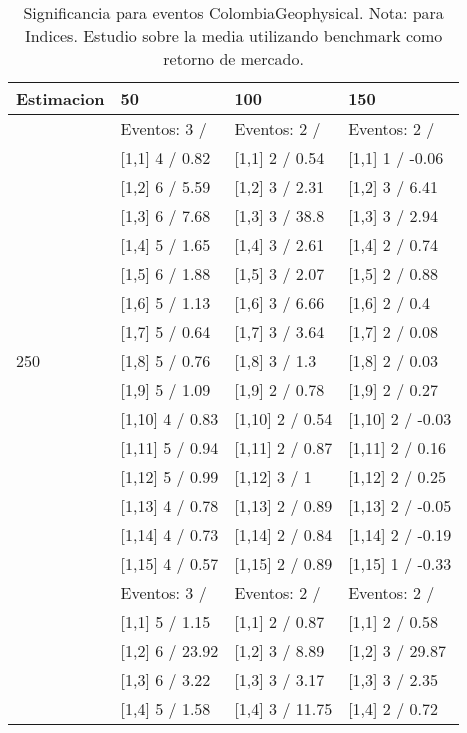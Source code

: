 \begin{table}

\caption{Significancia para eventos ColombiaGeophysical. Nota: para Indices. Estudio sobre la media utilizando benchmark como retorno de mercado.}
\centering
\begin{tabular}[t]{llll}
\toprule
Estimacion & 50 & 100 & 150\\
\midrule
 & Eventos:  3 / & Eventos:  2 / & Eventos:  2 /\\
 & {}[1,1] 4  / 0.82 & {}[1,1] 2  / 0.54 & {}[1,1] 1  / -0.06\\
 & {}[1,2] 6  / 5.59 & {}[1,2] 3  / 2.31 & {}[1,2] 3  / 6.41\\
 & {}[1,3] 6  / 7.68 & {}[1,3] 3  / 38.8 & {}[1,3] 3  / 2.94\\
 & {}[1,4] 5  / 1.65 & {}[1,4] 3  / 2.61 & {}[1,4] 2  / 0.74\\
\addlinespace
 & {}[1,5] 6  / 1.88 & {}[1,5] 3  / 2.07 & {}[1,5] 2  / 0.88\\
 & {}[1,6] 5  / 1.13 & {}[1,6] 3  / 6.66 & {}[1,6] 2  / 0.4\\
 & {}[1,7] 5  / 0.64 & {}[1,7] 3  / 3.64 & {}[1,7] 2  / 0.08\\
250 & {}[1,8] 5  / 0.76 & {}[1,8] 3  / 1.3 & {}[1,8] 2  / 0.03\\
 & {}[1,9] 5  / 1.09 & {}[1,9] 2  / 0.78 & {}[1,9] 2  / 0.27\\
\addlinespace
 & {}[1,10] 4  / 0.83 & {}[1,10] 2  / 0.54 & {}[1,10] 2  / -0.03\\
 & {}[1,11] 5  / 0.94 & {}[1,11] 2  / 0.87 & {}[1,11] 2  / 0.16\\
 & {}[1,12] 5  / 0.99 & {}[1,12] 3  / 1 & {}[1,12] 2  / 0.25\\
 & {}[1,13] 4  / 0.78 & {}[1,13] 2  / 0.89 & {}[1,13] 2  / -0.05\\
 & {}[1,14] 4  / 0.73 & {}[1,14] 2  / 0.84 & {}[1,14] 2  / -0.19\\
\addlinespace
 & {}[1,15] 4  / 0.57 & {}[1,15] 2  / 0.89 & {}[1,15] 1  / -0.33\\
 & Eventos:  3 / & Eventos:  2 / & Eventos:  2 /\\
 & {}[1,1] 5  / 1.15 & {}[1,1] 2  / 0.87 & {}[1,1] 2  / 0.58\\
 & {}[1,2] 6  / 23.92 & {}[1,2] 3  / 8.89 & {}[1,2] 3  / 29.87\\
 & {}[1,3] 6  / 3.22 & {}[1,3] 3  / 3.17 & {}[1,3] 3  / 2.35\\
\addlinespace
 & {}[1,4] 5  / 1.58 & {}[1,4] 3  / 11.75 & {}[1,4] 2  / 0.72\\

\end{tabular}
\end{table}
